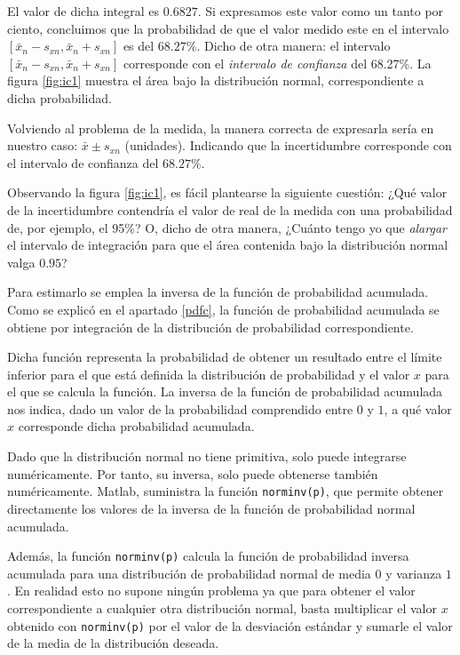 \begin{paracol}{2}
El valor de dicha integral es $0.6827$. Si expresamos este valor como un tanto por ciento, concluimos que la probabilidad de que el valor medido este en el intervalo $[\bar{x}_n-s_{xn}, \bar{x}_n+s_{xn}]$ es del $68.27\%$. Dicho de otra manera: el intervalo $[\bar{x}_n-s_{xn}, \bar{x}_n+s_{xn}]$ corresponde con el \emph{intervalo de confianza} del 68.27\%. La figura \ref{fig:ic1} muestra el área bajo la distribución normal, correspondiente a dicha probabilidad.

Volviendo al problema de la medida, la manera correcta de expresarla sería en nuestro caso:  $\bar{x}\pm s_{xn}$ (unidades). Indicando que la incertidumbre corresponde con el intervalo de confianza del $68.27\%$.


Observando la figura \ref{fig:ic1}, es fácil plantearse la siguiente cuestión: ¿Qué valor de la incertidumbre contendría el valor de real de la medida con una probabilidad de, por ejemplo, el 95\%? O, dicho de otra manera, ¿Cuánto tengo yo que \emph{alargar} el intervalo de integración para que el área contenida bajo la distribución normal valga $0.95$?

Para estimarlo se emplea la inversa de la función de probabilidad acumulada. Como se explicó en el apartado \ref{pdfc}, la función de probabilidad acumulada se obtiene por integración de la distribución de probabilidad correspondiente. 

Dicha función representa la probabilidad de obtener un resultado entre el límite inferior para el que está definida la distribución de probabilidad y el valor $x$ para el que se calcula la función. La inversa de la función de probabilidad acumulada nos indica, dado un valor de la probabilidad comprendido entre $0$ y $1$, a qué valor $x$ corresponde dicha probabilidad acumulada. 

Dado que la distribución normal no tiene primitiva, solo puede integrarse numéricamente. Por tanto, su inversa, solo puede obtenerse también numéricamente. Matlab, suministra la función \texttt{norminv(p)}, que permite obtener directamente los valores de la inversa de la función de probabilidad normal acumulada.

Además, la función \texttt{norminv(p)} calcula la función de probabilidad inversa acumulada para una distribución de probabilidad normal de media $0$ y varianza $1$. En realidad esto no supone ningún problema ya que para obtener el valor correspondiente a cualquier otra distribución normal, basta multiplicar el valor $x$ obtenido con \texttt{norminv(p)} por el valor de la desviación estándar y sumarle el valor de la media de la distribución deseada.


\end{paracol}
